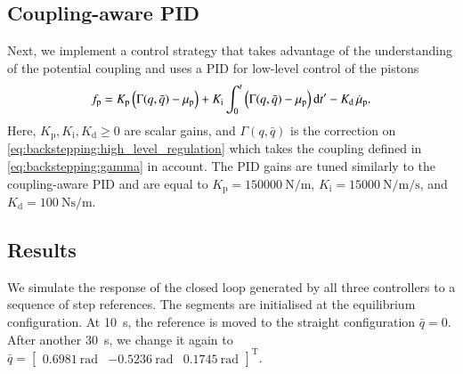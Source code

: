 %
\subsection{Coupling-aware PID}
%
Next, we implement a control strategy that takes advantage of the understanding of the potential coupling and uses a PID for low-level control of the pistons
%
\begin{equation}\small
    f_{\mathrm{p}} = K_\mathrm{p} \left (\Gamma(q, \bar{q})-\mu_\mathrm{p} \right ) +  K_\mathrm{i} \int_{0}^t \left ( \Gamma(q, \bar{q})-\mu_\mathrm{p} \right ) \mathrm{d}t' - K_\mathrm{d} \, \dot{\mu}_\mathrm{p}.
\end{equation}
%
Here, $K_\mathrm{p},K_\mathrm{i},K_\mathrm{d} \geq 0$ are scalar gains, and $\Gamma(q, \bar{q})$ is the correction on \eqref{eq:backstepping:high_level_regulation} which takes the coupling defined in \eqref{eq:backstepping:gamma} in account. 
%
The PID gains are tuned similarly to the coupling-aware PID
and are equal to $K_\mathrm{p} = \SI{150 000}{\newton \per \meter}$, $K_\mathrm{i} = \SI{15 000}{\newton \per \meter \per \second}$, and $K_\mathrm{d} = \SI{100}{\newton \second \per \meter}$. 

\subsection{Results}

We simulate the response of the closed loop generated by all three controllers to a sequence of step references. The segments are initialised at the equilibrium configuration. %
At \SI{10}{s}, the reference is moved to the straight configuration $\bar{q} =  0$. After another \SI{30}{s}, we change it again to $\bar{q} = \begin{bmatrix} \SI{0.6981}{\radian} & \SI{-0.5236}{\radian} & \SI{0.1745}{\radian} \end{bmatrix}^\mathrm{T}$.

